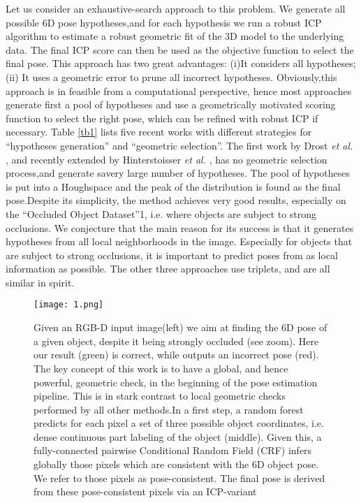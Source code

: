 \documentclass[10pt,twocolumn,a4paper]{article}
\begin{document}
  Let us consider an exhaustive-search approach to this problem.
  We generate all possible 6D pose hypotheses,and for each hypothesis
  we run a robust ICP algorithm \cite{c2} to estimate a robust geometric
   ﬁt of the 3D model to the underlying data. The ﬁnal ICP score can then be used
   as the objective function to select the ﬁnal pose. This approach has two great advantages:
   (i)It considers all hypotheses;(ii) It uses a geometric error to prune all
   incorrect hypotheses. Obviously,this approach is in feasible from a computational
   perspective, hence most approaches generate ﬁrst a pool of hypotheses and use a geometrically motivated
   scoring function to select the right pose, which can be reﬁned with robust ICP if necessary.
   Table \ref{tb1} lists ﬁve recent works with different strategies
   for “hypotheses generation” and “geometric selection”.
   The ﬁrst work by Drost \emph{et al.} \cite{c3},
    and recently extended by Hinterstoisser \emph{et al.} \cite{c4},
    has no geometric selection process,and generate savery large number
    of hypotheses. The pool of hypotheses is put into a Houghspace and the peak of
    the distribution is found as the ﬁnal pose.Despite its simplicity,
    the method achieves very good results, especially on the “Occluded Object Dataset”1,
     i.e. where objects are subject to strong occlusions.
     We conjecture that the main reason for its success is that it generates hypotheses
     from all local neighborhoods in the image. Especially for objects that are subject to strong occlusions,
     it is important to predict poses from as local information as possible.
     The other three approaches use triplets, and are all similar in spirit.

     \begin{figure}[htbp]
     \centering
     \texttt{[image: 1.png]}
     \caption{Given an RGB-D input image(left) we aim at ﬁnding the 6D pose of a given object, despite it being strongly occluded (see zoom). Here our result (green) is correct, while outputs an incorrect pose (red). The key concept of this work is to have a global, and hence powerful, geometric check, in the beginning of the pose estimation pipeline. This is in stark contrast to local geometric checks performed by all other methods.In a ﬁrst step, a random forest predicts for each pixel a set of three possible object coordinates, i.e. dense continuous part labeling of the object (middle). Given this, a fully-connected pairwise Conditional Random Field (CRF) infers globally those pixels which are consistent with the 6D object pose. We refer to those pixels as pose-consistent. The ﬁnal pose is derived from these pose-consistent pixels via an ICP-variant}
     \label{fig1}
     \end{figure}
\end{document}
